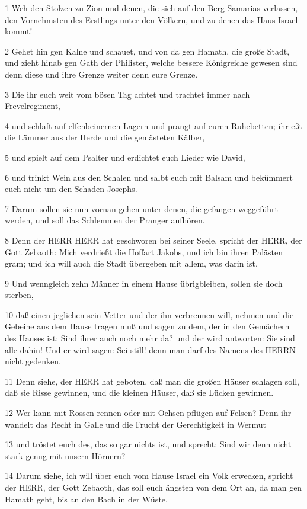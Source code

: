 \par 1 Weh den Stolzen zu Zion und denen, die sich auf den Berg Samarias verlassen, den Vornehmsten des Erstlings unter den Völkern, und zu denen das Haus Israel kommt!
\par 2 Gehet hin gen Kalne und schauet, und von da gen Hamath, die große Stadt, und zieht hinab gen Gath der Philister, welche bessere Königreiche gewesen sind denn diese und ihre Grenze weiter denn eure Grenze.
\par 3 Die ihr euch weit vom bösen Tag achtet und trachtet immer nach Frevelregiment,
\par 4 und schlaft auf elfenbeinernen Lagern und prangt auf euren Ruhebetten; ihr eßt die Lämmer aus der Herde und die gemästeten Kälber,
\par 5 und spielt auf dem Psalter und erdichtet euch Lieder wie David,
\par 6 und trinkt Wein aus den Schalen und salbt euch mit Balsam und bekümmert euch nicht um den Schaden Josephs.
\par 7 Darum sollen sie nun vornan gehen unter denen, die gefangen weggeführt werden, und soll das Schlemmen der Pranger aufhören.
\par 8 Denn der HERR HERR hat geschworen bei seiner Seele, spricht der HERR, der Gott Zebaoth: Mich verdrießt die Hoffart Jakobs, und ich bin ihren Palästen gram; und ich will auch die Stadt übergeben mit allem, was darin ist.
\par 9 Und wenngleich zehn Männer in einem Hause übrigbleiben, sollen sie doch sterben,
\par 10 daß einen jeglichen sein Vetter und der ihn verbrennen will, nehmen und die Gebeine aus dem Hause tragen muß und sagen zu dem, der in den Gemächern des Hauses ist: Sind ihrer auch noch mehr da? und der wird antworten: Sie sind alle dahin! Und er wird sagen: Sei still! denn man darf des Namens des HERRN nicht gedenken.
\par 11 Denn siehe, der HERR hat geboten, daß man die großen Häuser schlagen soll, daß sie Risse gewinnen, und die kleinen Häuser, daß sie Lücken gewinnen.
\par 12 Wer kann mit Rossen rennen oder mit Ochsen pflügen auf Felsen? Denn ihr wandelt das Recht in Galle und die Frucht der Gerechtigkeit in Wermut
\par 13 und tröstet euch des, das so gar nichts ist, und sprecht: Sind wir denn nicht stark genug mit unsern Hörnern?
\par 14 Darum siehe, ich will über euch vom Hause Israel ein Volk erwecken, spricht der HERR, der Gott Zebaoth, das soll euch ängsten von dem Ort an, da man gen Hamath geht, bis an den Bach in der Wüste.

